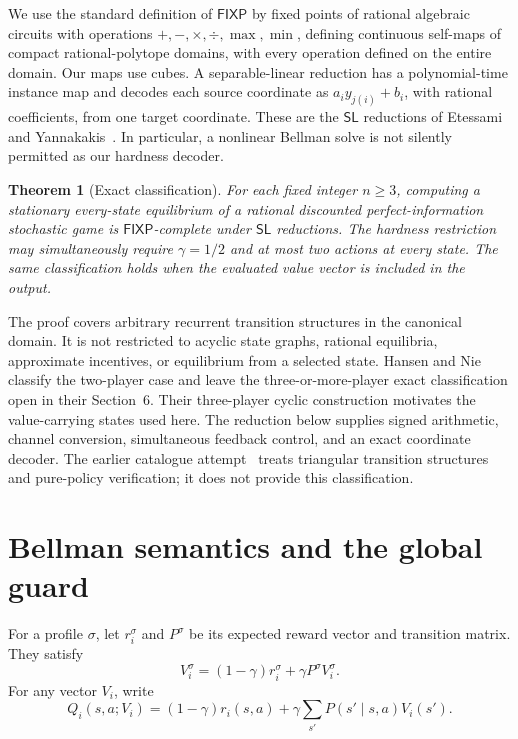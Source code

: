 \documentclass[11pt,a4paper]{article}
\numberwithin{equation}{section}
\newtheorem{theorem}{Theorem}
\theoremstyle{definition}
\newcommand{\FIXP}{\mathsf{FIXP}}
\newcommand{\SL}{\mathsf{SL}}
\begin{document}
We use the standard definition of \(\FIXP\) by fixed points of rational
algebraic circuits with operations \(+, -,\times,\div,\max,\min\),
defining continuous self-maps of compact rational-polytope domains, with
every operation defined on the entire domain. Our maps use cubes.
A separable-linear reduction has
a polynomial-time instance map and decodes each source coordinate as
\(a_i y_{j(i)}+b_i\), with rational coefficients, from one target
coordinate. These are the \(\SL\) reductions of Etessami and
Yannakakis~\cite{EY}. In particular, a nonlinear Bellman solve is not
silently permitted as our hardness decoder.

\begin{theorem}[Exact classification]\label{thm:main}
For each fixed integer \(n\geq3\), computing a stationary every-state
equilibrium of a rational discounted perfect-information stochastic game
is \(\FIXP\)-complete under \(\SL\) reductions. The hardness restriction
may simultaneously require \(\gamma=1/2\) and at most two actions at every
state. The same classification holds when the evaluated value vector is
included in the output.
\end{theorem}

The proof covers arbitrary recurrent transition structures in the
canonical domain. It is not restricted to acyclic state graphs, rational
equilibria, approximate incentives, or equilibrium from a selected state.
Hansen and Nie~\cite{HN} classify the two-player case and leave the
three-or-more-player exact classification open in their Section~6.
Their three-player cyclic construction motivates the value-carrying
states used here. The reduction below supplies signed arithmetic,
channel conversion, simultaneous feedback control, and an exact
coordinate decoder. The earlier catalogue attempt~\cite{prior} treats
triangular transition structures and pure-policy verification; it does
not provide this classification.

\section{Bellman semantics and the global guard}\label{sec:bellman}

For a profile \(\sigma\), let \(r_i^\sigma\) and \(P^\sigma\) be its
expected reward vector and transition matrix. They satisfy
\begin{equation}\label{eq:eval}
 V_i^\sigma=(1-\gamma)r_i^\sigma+\gamma P^\sigma V_i^\sigma.
\end{equation}
For any vector \(V_i\), write
\begin{equation}\label{eq:q}
 Q_i(s,a;V_i)=(1-\gamma)r_i(s,a)
                  +\gamma\sum_{s'}P(s'\mid s,a)V_i(s').
\end{equation}
\end{document}
